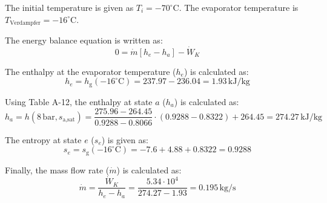 The initial temperature is given as \( T_i = -70^\circ\text{C} \).  
The evaporator temperature is \( T_{\text{Verdampfer}} = -16^\circ\text{C} \).

The energy balance equation is written as:  
\[
0 = \dot{m} \left[ h_e - h_a \right] - \dot{W}_K
\]

The enthalpy at the evaporator temperature (\( h_e \)) is calculated as:  
\[
h_e = h_{\text{g}}(-16^\circ\text{C}) = 237.97 - 236.04 = 1.93 \, \text{kJ/kg}
\]

Using Table A-12, the enthalpy at state \( a \) (\( h_a \)) is calculated as:  
\[
h_a = h(8 \, \text{bar}, s_{\text{a,sat}}) = \frac{275.96 - 264.45}{0.9288 - 0.8066} \cdot (0.9288 - 0.8322) + 264.45 = 274.27 \, \text{kJ/kg}
\]

The entropy at state \( e \) (\( s_e \)) is given as:  
\[
s_e = s_{\text{g}}(-16^\circ\text{C}) = -7.6 + 4.88 + 0.8322 = 0.9288
\]

Finally, the mass flow rate (\( \dot{m} \)) is calculated as:  
\[
\dot{m} = \frac{\dot{W}_K}{h_e - h_a} = \frac{5.34 \cdot 10^4}{274.27 - 1.93} = 0.195 \, \text{kg/s}
\]